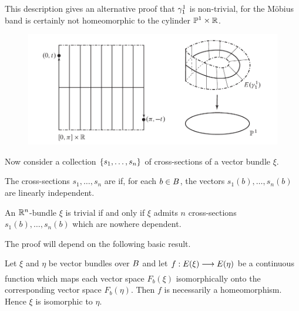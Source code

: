 \documentclass[../main]{subfiles}
\begin{document}
This description gives an alternative proof that $\gamma^1_1$ is non-trivial, for the M\"obius band is certainly not homeomorphic to the cylinder $\mathbb{P}^{1}\times \mathbb R$.
	
\begin{figure}[ht]
    \centering
    \includegraphics[scale=0.5]{"../tex from old group/fig2.png"}
    \caption{}
    \label{fig:figure2}
\end{figure}

Now consider a collection $\left\{s_1,\dots,s_n\right\}$ of cross-sections of a vector bundle $\xi$.


\begin{definition}\label{def:02.04}
The cross-sections $s_1, \ldots, s_n$ are 
if, for each $b \in {B}$, the vectors $s_1(b), \ldots, s_n(b)$ are linearly independent.
\end{definition}


\begin{theorem}\label{thm:02.02}
An $\mathbb R^n$-bundle $\xi$ is trivial if and only if $\xi$ admits $n$ cross-sections $s_1(b), \ldots, s_n(b)$ which are nowhere dependent.
\end{theorem}


The proof will depend on the following basic result.


\begin{lemma}\label{lem:02.03}
Let $\xi$ and $\eta$ be vector bundles over ${B}$ and let
$f: \total(\xi) \varrightarrow{} \total(\eta)$ be a continuous function which maps each vector space $F_{b}(\xi)$ isomorphically onto the corresponding vector space $F_{b}(\eta)$. Then $f$ is necessarily a homeomorphism. Hence $\xi$ is isomorphic to $\eta$. 
\end{lemma}
\end{document}
